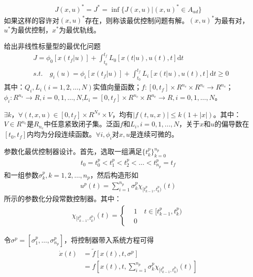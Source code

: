             \begin{align*}
            J(x,u)^* = J^* = \inf\{J(x,u)|(x,u)^*\in A_{ad}\}
            \end{align*}
            如果这样的容许对$(x,u)^*$存在，则称该最优控制问题有解。$(x,u)^*$为最有对，$u^*$为最优控制，$x^*$为最优轨线。
            \par
            给出非线性标量型的最优化问题
            \begin{align*}
            & J = \phi_0[x(t_f|u)]+\int_{t_0}^{t_f}L_0[x(t|u),u(t),t]\mathrm{d}t\\
            & s.t.\quad g_i(u) = \phi_i[x(t_f|u)]+\int_{t_0}^{t_f}L_i[x(t|u),u(t),t] \mathrm{d}t \geqslant 0
            \end{align*}
            其中：$Q_i,L_i(i=1,2,\dots,N)$实值向量函数；$f:[0,t_f]\times R^{n_s}\times R^{n_c}\to R^{n_s}$；$\phi_i:R^{n_s}\to R,i=0,1,\dots,N$,$L_i = [0,t_f] \times R^{n_c}\times R^{n_c}\to R,i=0,1,\dots,N$。
            \par
            $\exists k$，$\forall (t,x,u)\in [0,t_f]\times R^{N_S}\times V$，均有$|f(t,u,x)| \leqslant k(1+|x|)$。其中：$V\in R^{n_c}$是$R_{n_c}$中任意紧致闭子集。泛函$f$和$L_i,i=0,1,\dots,N$，关于$x$和$u$的偏导数在$[t_0,t_f]$内均为分段连续函数。$\forall i,\phi_i$对$x,u$是连续可微的。
            \par
            参数化最优控制器设计。首先，选取一组满足$\{t_k^p\}_{k=0}^{n_p}$
            \begin{align*}
            t_0 = t_0^p<t_1^p<t_2^p <\dots<t_{n_p}^p = t_f
            \end{align*}
            和一组参数$\sigma_k^p,k=1,2,\dots,n_p$，然后构造形如
            \begin{align*}
            u^p(t) = \sum_{i=1}^{n_p} \sigma_k^p \chi_{[t_{k-1}^p,t_{k}^p)}(t)
            \end{align*}
            所示的参数化分段常数控制器。其中：
            \begin{align*}
            \chi_{[t_{k-1}^p,t_{k}^p)}(t) = \left\{
            \begin{aligned}
            &1\quad t\in[t_{k-1}^p,t_k^p)\\
            &0
            \end{aligned}
            \right.
            \end{align*}
            \par
            令$\sigma^p = [\sigma_1^p,\dots,\sigma_{n_p}^p]$，将控制器带入系统方程可得
            \begin{align*}
            \dot{x}(t) &= \tilde{f}[x(t),t,\sigma^p]\\
            &=f\left[x(t),t,\sum_{i=1}^{n_p} \sigma_k^p \chi_{[t_{k-1}^p,t_{k}^p)}(t)\right]
            \end{align*}
